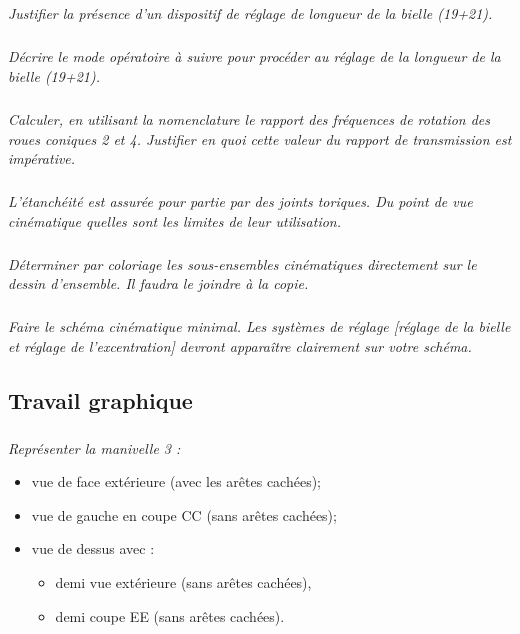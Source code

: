 \begin{multicols}{2}
\begin{multicols}{2}
\subparagraph{}\textit{Justifier la présence d’un dispositif de réglage de longueur de la bielle (19+21).}

\subparagraph{}\textit{Décrire le mode opératoire à suivre pour procéder au réglage de la longueur de la bielle (19+21).}

\subparagraph{}\textit{Calculer, en utilisant la nomenclature le rapport des fréquences de rotation des roues coniques  2 et 4. Justifier en quoi cette valeur du rapport de transmission est impérative.}

\subparagraph{}\textit{L’étanchéité est assurée pour partie par des joints toriques. Du point de vue cinématique quelles sont les limites de leur utilisation.}

\subparagraph{}\textit{Déterminer par coloriage les sous-ensembles cinématiques directement sur le dessin d’ensemble. Il faudra le  joindre à la copie.}

\subparagraph{}\textit{Faire le schéma cinématique minimal. Les systèmes de réglage [réglage de la bielle et réglage de l'excentration] devront apparaître clairement sur votre schéma.}

\subsection*{Travail graphique}
\subparagraph{}\textit{Représenter la manivelle 3 :}
\begin{itemize}
\item vue de face extérieure (avec les arêtes cachées);
\item vue de gauche en coupe CC (sans arêtes cachées);
\item vue de dessus avec :
\begin{itemize}
\item demi vue extérieure (sans arêtes cachées),
\item demi coupe EE (sans arêtes cachées).
\end{itemize}
\end{itemize}
\ifprof
\end{multicols}
\else
\end{multicols}
\fi


